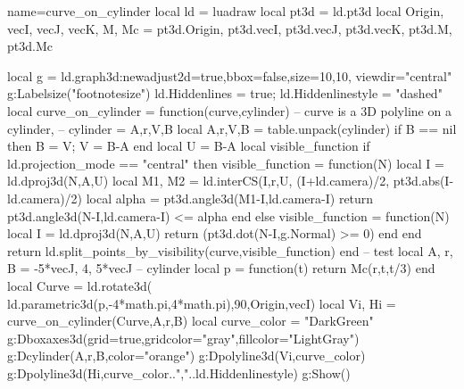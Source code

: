 \begin{luadraw}{name=curve_on_cylinder}
local ld = luadraw
local pt3d = ld.pt3d
local Origin, vecI, vecJ, vecK, M, Mc = pt3d.Origin, pt3d.vecI, pt3d.vecJ, pt3d.vecK, pt3d.M, pt3d.Mc

local g = ld.graph3d:new{adjust2d=true,bbox=false,size={10,10}, viewdir="central"}
g:Labelsize("footnotesize")
ld.Hiddenlines = true; ld.Hiddenlinestyle = "dashed"
local curve_on_cylinder = function(curve,cylinder)
-- curve is a 3D polyline on a cylinder,
-- cylinder = {A,r,V,B}
    local A,r,V,B = table.unpack(cylinder)
    if B == nil then B = V; V = B-A end
    local U = B-A
    local visible_function
    if ld.projection_mode == "central" then
        visible_function = function(N)
            local I = ld.dproj3d(N,{A,U})
            local M1, M2 = ld.interCS({I,r,U},{ (I+ld.camera)/2, pt3d.abs(I-ld.camera)/2})
            local alpha = pt3d.angle3d(M1-I,ld.camera-I)
            return pt3d.angle3d(N-I,ld.camera-I) <= alpha
        end
    else
        visible_function = function(N)
            local I = ld.dproj3d(N,{A,U})
            return (pt3d.dot(N-I,g.Normal) >= 0)
        end
    end
    return ld.split_points_by_visibility(curve,visible_function)
end
-- test
local A, r, B = -5*vecJ, 4, 5*vecJ -- cylinder
local p = function(t) return Mc(r,t,t/3) end
local Curve = ld.rotate3d( ld.parametric3d(p,-4*math.pi,4*math.pi),90,{Origin,vecI})
local Vi, Hi = curve_on_cylinder(Curve,{A,r,B})
local curve_color = "DarkGreen"
g:Dboxaxes3d({grid=true,gridcolor="gray",fillcolor="LightGray"})
g:Dcylinder(A,r,B,{color="orange"})
g:Dpolyline3d(Vi,curve_color)
g:Dpolyline3d(Hi,curve_color..","..ld.Hiddenlinestyle)
g:Show()
\end{luadraw}

